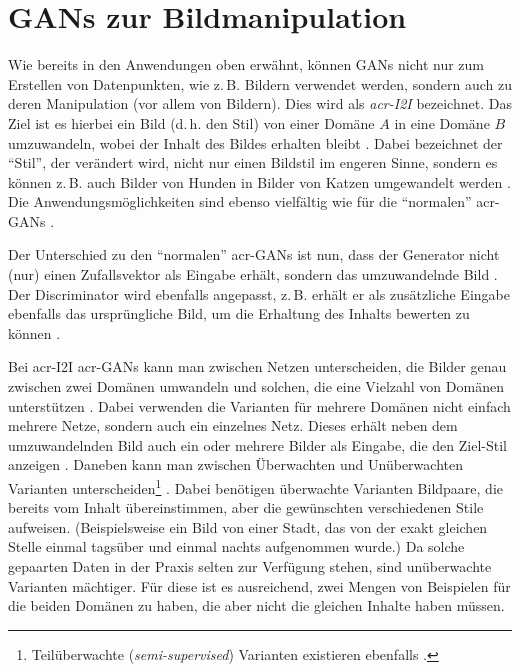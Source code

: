 \section{GANs zur Bildmanipulation}\label{GANsBildmanipulation}

Wie bereits in den Anwendungen oben erwähnt, können GANs nicht nur zum Erstellen
von Datenpunkten, wie z.\,B. Bildern verwendet werden, sondern auch zu deren
Manipulation (vor allem von Bildern). Dies wird als \emph{\gls{acr-I2I}}
bezeichnet. Das Ziel ist es hierbei ein Bild (d.\,h. den Stil) von einer Domäne
$A$ in eine Domäne $B$ umzuwandeln, wobei der Inhalt des Bildes erhalten bleibt
\cite{pang2021image}. Dabei bezeichnet der \enquote{Stil}, der verändert wird,
nicht nur einen Bildstil im engeren Sinne, sondern es können z.\,B. auch Bilder
von Hunden in Bilder von Katzen umgewandelt werden \cite{liu2019few}.
Die Anwendungsmöglichkeiten sind ebenso vielfältig wie für die \enquote{normalen}
\gls{acr-GAN}s \cite[vgl.][S. 1]{pang2021image}.

Der Unterschied zu den \enquote{normalen} \gls{acr-GAN}s ist nun, dass der Generator
nicht (nur) einen Zufallsvektor als Eingabe erhält, sondern das umzuwandelnde
Bild \cite{pang2021image}. Der Discriminator wird ebenfalls angepasst, z.\,B. erhält er als
zusätzliche Eingabe ebenfalls das ursprüngliche Bild, um die Erhaltung des
Inhalts bewerten zu können \cite{isola2017image}.

Bei \gls{acr-I2I} \gls{acr-GAN}s kann man zwischen Netzen unterscheiden, die
Bilder genau zwischen zwei Domänen umwandeln \cite{isola2017image,
zhu2017unpaired, ledig2017photo, demir2018patch} und solchen, die eine Vielzahl von
Domänen unterstützen
\cite{liu2019few,huang2017arbitrary,saito2020coco,anokhin2020high}. Dabei
verwenden die Varianten für mehrere Domänen nicht einfach mehrere Netze, sondern
auch ein einzelnes
Netz. Dieses erhält neben dem umzuwandelnden Bild auch ein oder mehrere Bilder
als Eingabe, die den Ziel-Stil anzeigen \cites{pang2021image}{liu2019few}.
Daneben kann man zwischen Überwachten \cite{isola2017image,ledig2017photo,demir2018patch} und Unüberwachten
\cite{liu2019few,zhu2017unpaired,huang2017arbitrary,saito2020coco,anokhin2020high,}
Varianten unterscheiden\footnote{Teilüberwachte (\emph{semi-supervised})
Varianten existieren ebenfalls \cite{pang2021image}.}  \cite[vgl.][S. 5,
11]{pang2021image}.
Dabei benötigen
überwachte Varianten Bildpaare, die bereits vom Inhalt übereinstimmen, aber die
gewünschten verschiedenen Stile aufweisen. (Beispielsweise ein Bild von einer Stadt, das
von der exakt gleichen Stelle einmal tagsüber und einmal nachts aufgenommen
wurde.) Da solche gepaarten Daten in der Praxis selten zur Verfügung stehen,
sind unüberwachte Varianten mächtiger. Für diese ist es ausreichend, zwei Mengen
von Beispielen für die beiden Domänen zu haben, die aber nicht die gleichen
Inhalte haben müssen.